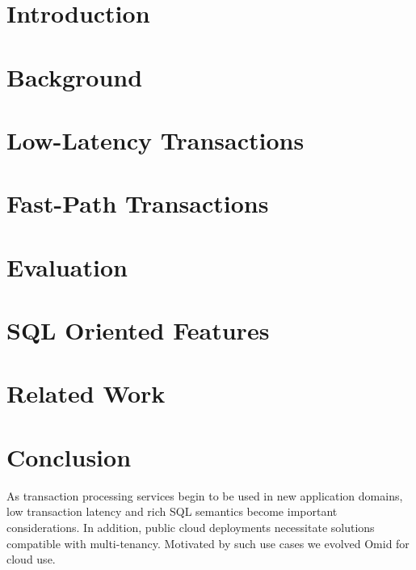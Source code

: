 \documentclass{vldb}
\begin{document}

\section{Introduction} \label{sec:intro}
 

\section{Background} \label{sec:api}


\section{Low-Latency Transactions} \label{sec:ll}



\section{Fast-Path Transactions}
\label{sec:alg}


\section{Evaluation} \label{sec:eval}


\vspace{-0.3cm}
\section{SQL Oriented Features} \label{sec:sql}

\vspace{-0.3cm}
\section{Related Work} \label{sec:related}

\vspace{-0.3cm}
\section{Conclusion} \label{sec:conclusions}
\vspace{-0.2cm}

As transaction processing services begin to be used in 
new application domains, low transaction latency and rich SQL semantics
become important considerations. In addition, public cloud deployments 
necessitate solutions compatible with multi-tenancy.
Motivated by such use cases we evolved Omid for cloud use.
\end{document}
